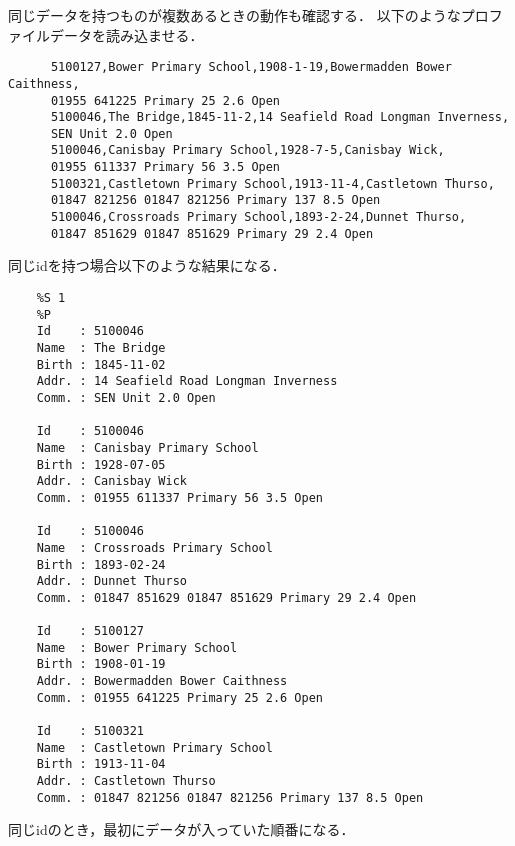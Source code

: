       同じデータを持つものが複数あるときの動作も確認する．
      以下のようなプロファイルデータを読み込ませる．
    \begin{verbatim}
      5100127,Bower Primary School,1908-1-19,Bowermadden Bower Caithness,
      01955 641225 Primary 25 2.6 Open
      5100046,The Bridge,1845-11-2,14 Seafield Road Longman Inverness,
      SEN Unit 2.0 Open
      5100046,Canisbay Primary School,1928-7-5,Canisbay Wick,
      01955 611337 Primary 56 3.5 Open
      5100321,Castletown Primary School,1913-11-4,Castletown Thurso,
      01847 821256 01847 821256 Primary 137 8.5 Open
      5100046,Crossroads Primary School,1893-2-24,Dunnet Thurso,
      01847 851629 01847 851629 Primary 29 2.4 Open
    \end{verbatim}
    同じidを持つ場合以下のような結果になる．
    \begin{verbatim}
    %S 1
    %P
    Id    : 5100046
    Name  : The Bridge
    Birth : 1845-11-02
    Addr. : 14 Seafield Road Longman Inverness
    Comm. : SEN Unit 2.0 Open

    Id    : 5100046
    Name  : Canisbay Primary School
    Birth : 1928-07-05
    Addr. : Canisbay Wick
    Comm. : 01955 611337 Primary 56 3.5 Open

    Id    : 5100046
    Name  : Crossroads Primary School
    Birth : 1893-02-24
    Addr. : Dunnet Thurso
    Comm. : 01847 851629 01847 851629 Primary 29 2.4 Open

    Id    : 5100127
    Name  : Bower Primary School
    Birth : 1908-01-19
    Addr. : Bowermadden Bower Caithness
    Comm. : 01955 641225 Primary 25 2.6 Open

    Id    : 5100321
    Name  : Castletown Primary School
    Birth : 1913-11-04
    Addr. : Castletown Thurso
    Comm. : 01847 821256 01847 821256 Primary 137 8.5 Open
    \end{verbatim}
    同じidのとき，最初にデータが入っていた順番になる．
